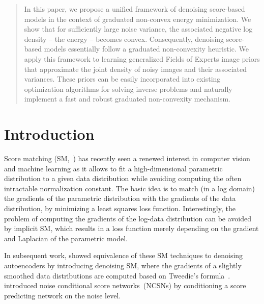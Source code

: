 \documentclass{article}
\theoremstyle{plain}
\theoremstyle{definition}
\theoremstyle{remark}
\begin{document}
\printAffiliationsAndNotice{\icmlEqualContribution} %

\begin{abstract}
In this paper, we propose a unified framework of denoising score-based models in the context of graduated non-convex energy minimization.
We show that for sufficiently large noise variance, the associated negative log density -- the energy -- becomes convex. Consequently, denoising score-based models essentially follow a graduated non-convexity heuristic.
We apply this framework to learning generalized Fields of Experts image priors that approximate the joint density of noisy images and their associated variances.
These priors can be easily incorporated into existing optimization algorithms for solving inverse problems and naturally implement a fast and robust graduated non-convexity mechanism.
\end{abstract}

\section{Introduction}


Score matching (SM,~\citealp{Hy05}) has recently seen a renewed interest in computer vision and machine learning as it allows to fit a high-dimensional parametric distribution to a given data distribution while avoiding computing the often intractable normalization constant. The basic idea is to match (in a log domain) the gradients of the parametric distribution with the gradients of the data distribution, by minimizing a least squares loss function. Interestingly, the problem of computing the gradients of the log-data distribution can be avoided by implicit SM, which results in a loss function merely depending on the gradient and Laplacian of the parametric model.

In subsequent work, \citet{Vi11} showed equivalence of these SM techniques to denoising autoencoders by introducing denoising SM, where the gradients of a slightly smoothed data distributions are computed based on Tweedie's formula~\cite{Ef11}.
\citet{SoEr19,SoEr20} introduced noise conditional score networks~(NCSNs) by conditioning a score predicting network on the noise level.
\end{document}
